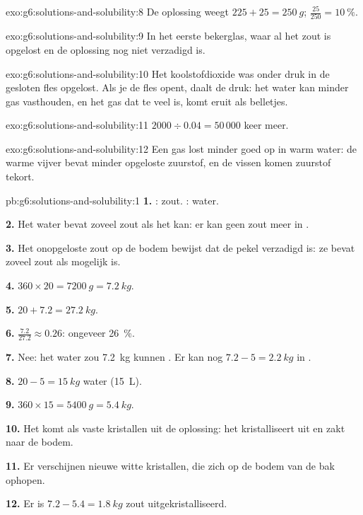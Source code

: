 \begin{solution}{exo:g6:solutions-and-solubility:8}
De oplossing weegt $225 + 25 = \qty{250}{g}$; $\frac{25}{250} =
\qty{10}{\percent}$.
\end{solution}

\begin{solution}{exo:g6:solutions-and-solubility:9}
In het eerste bekerglas, waar al het zout is opgelost en de oplossing nog
niet verzadigd is.
\end{solution}

\begin{solution}{exo:g6:solutions-and-solubility:10}
Het koolstofdioxide was onder druk in de gesloten fles opgelost. Als je
de fles opent, daalt de druk: het water kan minder gas vasthouden, en het
gas dat te veel is, komt eruit als belletjes.
\end{solution}

\begin{solution}{exo:g6:solutions-and-solubility:11}
$2000 \div 0.04 = 50\,000$ keer meer.
\end{solution}

\begin{solution}{exo:g6:solutions-and-solubility:12}
Een gas lost minder goed op in warm water: de warme vijver bevat minder
opgeloste zuurstof, en de vissen komen zuurstof tekort.
\end{solution}

\begin{solution}{pb:g6:solutions-and-solubility:1}
\textbf{1.} : zout. : water.

\textbf{2.} Het water bevat zoveel zout als het kan: er kan geen zout
meer in .

\textbf{3.} Het onopgeloste zout op de bodem bewijst dat de pekel
verzadigd is: ze bevat zoveel zout als mogelijk is.

\textbf{4.} $360 \times 20 = \qty{7200}{g} = \qty{7.2}{kg}$.

\textbf{5.} $20 + 7.2 = \qty{27.2}{kg}$.

\textbf{6.} $\frac{7.2}{27.2} \approx 0.26$: ongeveer \qty{26}{\percent}.

\textbf{7.} Nee: het water zou \qty{7.2}{kg} kunnen . Er kan nog
$7.2 - 5 = \qty{2.2}{kg}$ in .

\textbf{8.} $20 - 5 = \qty{15}{kg}$ water (\qty{15}{L}).

\textbf{9.} $360 \times 15 = \qty{5400}{g} = \qty{5.4}{kg}$.

\textbf{10.} Het komt als vaste kristallen uit de oplossing: het
kristalliseert uit en zakt naar de bodem.

\textbf{11.} Er verschijnen nieuwe witte kristallen, die zich op de bodem
van de bak ophopen.

\textbf{12.} Er is $7.2 - 5.4 = \qty{1.8}{kg}$ zout uitgekristalliseerd.
\end{solution}
